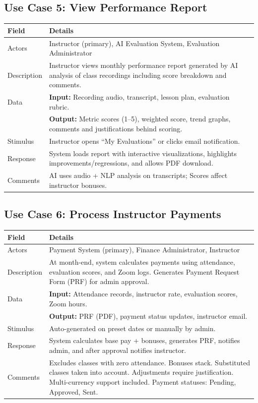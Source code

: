 \subsection{Use Case 5: View Performance Report}

\begin{tabular}{|p{3.5cm}|p{11cm}|}
\hline
\textbf{Field} & \textbf{Details} \\ \hline
Actors & Instructor (primary), AI Evaluation System, Evaluation Administrator \\ \hline
Description & Instructor views monthly performance report generated by AI analysis of class recordings including score breakdown and comments. \\ \hline
Data & \textbf{Input:} Recording audio, transcript, lesson plan, evaluation rubric. \\
& \textbf{Output:} Metric scores (1--5), weighted score, trend graphs, comments and justifications behind scoring. \\ \hline
Stimulus & Instructor opens ``My Evaluations'' or clicks email notification. \\ \hline
Response & System loads report with interactive visualizations, highlights improvements/regressions, and allows PDF download. \\ \hline
Comments & AI uses audio + NLP analysis on transcripts; Scores affect instructor bonuses. \\ \hline
\end{tabular}

\subsection{Use Case 6: Process Instructor Payments}

\begin{tabular}{|p{3.5cm}|p{11cm}|}
\hline
\textbf{Field} & \textbf{Details} \\ \hline
Actors & Payment System (primary), Finance Administrator, Instructor \\ \hline
Description & At month-end, system calculates payments using attendance, evaluation scores, and Zoom logs. Generates Payment Request Form (PRF) for admin approval. \\ \hline
Data & \textbf{Input:} Attendance records, instructor rate, evaluation scores, Zoom hours. \\
& \textbf{Output:} PRF (PDF), payment status updates, instructor email. \\ \hline
Stimulus & Auto-generated on preset dates or manually by admin. \\ \hline
Response & System calculates base pay + bonuses, generates PRF, notifies admin, and after approval notifies instructor. \\ \hline
Comments & Excludes classes with zero attendance. Bonuses stack. Substituted classes taken into account. Adjustments require justification. Multi-currency support included. Payment statuses: Pending, Approved, Sent. \\ \hline
\end{tabular}

